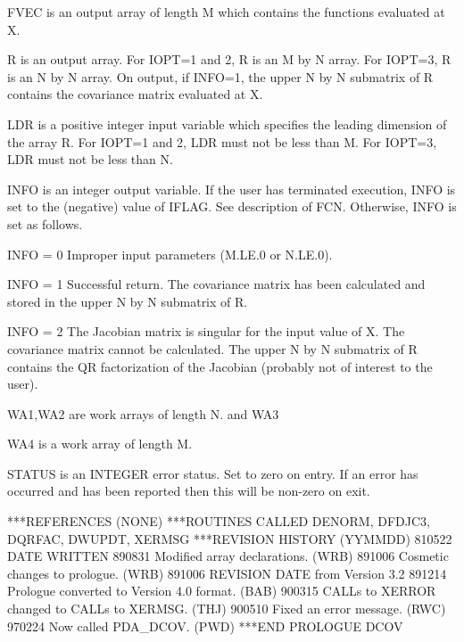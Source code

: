 \documentclass[11pt,twoside,nolof]{starlink}
\begin{document}
\begin{terminalv}
    FVEC is an output array of length M which contains the functions
         evaluated at X.

       R is an output array.  For IOPT=1 and 2, R is an M by N array.
         For IOPT=3, R is an N by N array.  On output, if INFO=1,
         the upper N by N submatrix of R contains the covariance
         matrix evaluated at X.

     LDR is a positive integer input variable which specifies
         the leading dimension of the array R.  For IOPT=1 and 2,
         LDR must not be less than M.  For IOPT=3, LDR must not
         be less than N.

    INFO is an integer output variable.  If the user has terminated
         execution, INFO is set to the (negative) value of IFLAG.  See
         description of FCN. Otherwise, INFO is set as follows.

         INFO = 0 Improper input parameters (M.LE.0 or N.LE.0).

         INFO = 1 Successful return.  The covariance matrix has been
                  calculated and stored in the upper N by N
                  submatrix of R.

         INFO = 2 The Jacobian matrix is singular for the input value
                  of X.  The covariance matrix cannot be calculated.
                  The upper N by N submatrix of R contains the QR
                  factorization of the Jacobian (probably not of
                  interest to the user).

      WA1,WA2 are work arrays of length N.
              and WA3

     WA4 is a work array of length M.


       STATUS is an INTEGER error status. Set to zero on entry.
              If an error has occurred and has been reported then
              this will be non-zero on exit.

***REFERENCES  (NONE)
***ROUTINES CALLED  DENORM, DFDJC3, DQRFAC, DWUPDT, XERMSG
***REVISION HISTORY  (YYMMDD)
   810522  DATE WRITTEN
   890831  Modified array declarations.  (WRB)
   891006  Cosmetic changes to prologue.  (WRB)
   891006  REVISION DATE from Version 3.2
   891214  Prologue converted to Version 4.0 format.  (BAB)
   900315  CALLs to XERROR changed to CALLs to XERMSG.  (THJ)
   900510  Fixed an error message.  (RWC)
   970224  Now called PDA_DCOV. (PWD)
***END PROLOGUE  DCOV
\end{terminalv}

\end{document}

